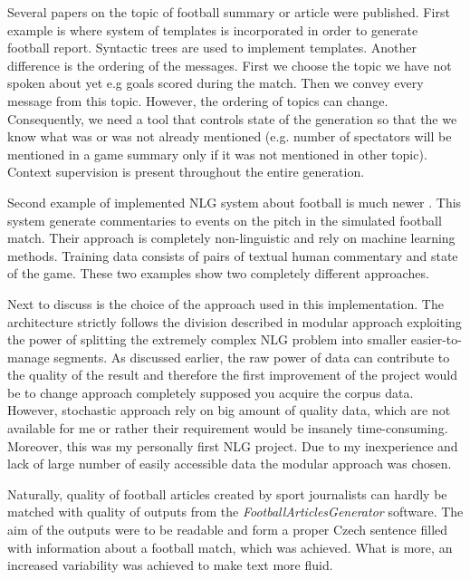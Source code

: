 Several papers on the topic of football summary or article were published. First example is \cite{et1997generation} where system of templates is incorporated in order to generate football report. Syntactic trees are used to implement templates. Another difference is the ordering of the messages. First we choose the topic we have not spoken about yet e.g goals scored during the match. Then we convey every message from this topic. However, the ordering of topics can change. Consequently, we need a tool that controls state of the generation so that the we know what was or was not already mentioned (e.g. number of spectators will be mentioned in a game summary only if it was not mentioned in other topic). Context supervision is present throughout the entire generation.

Second example of implemented NLG system about football is much newer \cite{chen2008learning}. This system generate commentaries to events on the pitch in the simulated football match. Their approach is completely non-linguistic and rely on machine learning methods. Training data consists of pairs of textual human commentary and state of the game. These two examples show two completely different approaches.

Next to discuss is the choice of the approach used in this implementation. The architecture strictly follows the division described in modular approach exploiting the power of splitting the extremely complex NLG problem into smaller easier-to-manage segments. As discussed earlier, the raw power of data can contribute to the quality of the result and therefore the first improvement of the project would be to change approach completely supposed you acquire the corpus data. However, stochastic approach rely on big amount of quality data, which are not available for me or rather their requirement would be insanely time-consuming. Moreover, this was my personally first NLG project. Due to my inexperience and lack of large number of easily accessible data the modular approach was chosen.

Naturally, quality of football articles created by sport journalists can hardly be matched with quality of outputs from the \textit{FootballArticlesGenerator} software. The aim of the outputs were to be readable and form a proper Czech sentence filled with information about a football match, which was achieved. What is more, an increased variability was achieved to make text more fluid.

